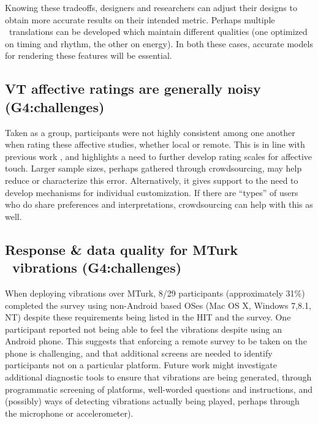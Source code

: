      Knowing these tradeoffs, designers and researchers can adjust their designs to obtain more accurate results on their intended metric. 
     Perhaps multiple \lofi\ translations can be developed which maintain different qualities (one optimized on timing and rhythm, the other on energy).
     In both these cases, accurate models for rendering these features will be essential.
        
        
		
	\subsection{VT %
	affective ratings are generally noisy (G4:challenges)}
   Taken as a group, participants were not highly consistent among one another when rating these %
   affective studies, whether local or remote.
  This is in line with previous work \cite{Seifi2015}, and highlights a need to further develop rating scales for affective touch.
   Larger sample sizes, perhaps gathered through crowdsourcing, may help reduce or characterize this error. Alternatively, it gives support to the need to develop mechanisms for individual customization. If there are ``types'' of users who do share preferences and interpretations, crowdsourcing can help with this as well.
   
\subsection{Response \& data quality for MTurk \lofi\ vibrations (G4:challenges)}
When deploying vibrations over MTurk, 8/29 participants (approximately 31\%) completed the survey using non-Android based OSes (Mac OS X, Windows 7,8.1, NT) despite these requirements being listed in the HIT and the survey. One participant reported not being able to feel the vibrations despite using an Android phone. 
This suggests that enforcing a remote survey to be taken on the phone is challenging, and that additional screens are needed to identify participants not on a particular platform.
Future work might investigate additional diagnostic tools to ensure that vibrations are being generated, through programmatic screening of platforms, well-worded questions and instructions, and (possibly) ways of detecting vibrations actually being played, perhaps through the microphone or accelerometer).



